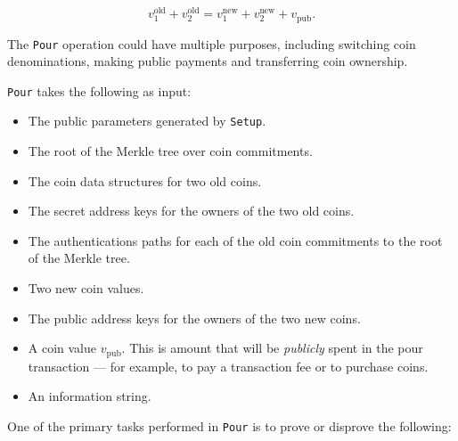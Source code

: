 \documentclass{article}
\begin{document}
\begin{equation}
v_1^{\text{old}} + v_2^{\text{old}} = v_1^{\text{new}} + v_2^{\text{new}} + v_{\text{pub}}.
\label{balance}
\end{equation}
\newline

The \texttt{Pour} operation could have multiple purposes, including switching coin denominations, making public payments and transferring coin ownership.

\texttt{Pour} takes the following as input:

\begin{itemize}
\item The public parameters generated by \texttt{Setup}.
\item The root of the Merkle tree over coin commitments.
\item The coin data structures for two old coins.
\item The secret address keys for the owners of the two old coins.
\item The authentications paths for each of the old coin commitments to the root of the Merkle tree.
\item Two new coin values.
\item The public address keys for the owners of the two new coins.
\item A coin value $v_\text{pub}$. This is amount that will be \emph{publicly} spent in the pour transaction --- for example, to pay a transaction fee or to purchase coins.
\item An information string.
\end{itemize}

One of the primary tasks performed in \texttt{Pour} is to prove or disprove the following: \newline

\medskip
\end{document}
